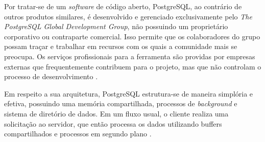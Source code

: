 Por tratar-se de um \textit{software} de código aberto, PostgreSQL, ao contrário de outros produtos similares, é desenvolvido e gerenciado exclusivamente pelo \textit{The PostgreSQL Global Development Group}, não possuindo um proprietário corporativo ou contraparte comercial. Isso permite que os colaboradores do grupo possam traçar e trabalhar em recursos com os quais a comunidade mais se preocupa. Os serviços profissionais para a ferramenta são providas por empresas externas que frequentemente contribuem para o projeto, mas que não controlam o processo de desenvolvimento \cite{Prisma2020}.

Em respeito a sua arquitetura, PostgreSQL estrutura-se de maneira simplória e efetiva, possuindo uma memória compartilhada, processos de \textit{background} e sistema de diretório de dados. Em um fluxo usual, o cliente realiza uma solicitação ao servidor, que então processa os dados utilizando buffers compartilhados e processos em segundo plano \cite{Kinsta2023}.
